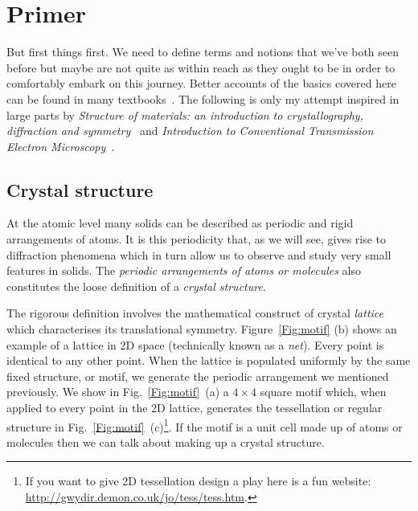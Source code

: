 \section{Primer}
But first things first. We need to define terms and notions that we've both seen before but maybe are not quite as within reach as they ought to be in order to comfortably embark on this journey. Better accounts of the basics covered here can be found in many textbooks~\cite{electronMicroscopy,Williams96,reimerSEM}. The following is only my attempt inspired in large parts by \textit{Structure of materials: an introduction to crystallography, diffraction and symmetry}~\cite{SoM} and \textit{Introduction to Conventional Transmission Electron Microscopy}~\cite{MarcTEM03}.

\subsection{Crystal structure}
\label{Sec:crystalStruct}
At the atomic level many solids can be described as periodic and rigid arrangements of atoms. It is this periodicity that, as we will see, gives rise to diffraction phenomena which in turn allow us to observe and study very small features in solids. The \textit{periodic arrangements of atoms or molecules} also constitutes the loose definition of a \textit{crystal structure}.

The rigorous definition involves the mathematical construct of crystal \textit{lattice} which characterises its translational symmetry. Figure~\ref{Fig:motif} (b) shows an example of a lattice in 2D space (technically known as a \textit{net}). Every point is identical to any other point. When the lattice is populated uniformly by the same fixed structure, or motif, we generate the periodic arrangement we mentioned previously. We show in Fig.~\ref{Fig:motif}~(a) a $4\times4$ square motif which, when applied to every point in the 2D lattice, generates the tessellation or regular structure in Fig.~\ref{Fig:motif}~(c)\footnote{If you want to give 2D tessellation design a play here is a fun website: \href{http://gwydir.demon.co.uk/jo/tess/tess.htm}{http://gwydir.demon.co.uk/jo/tess/tess.htm}.}. If the motif is a unit cell made up of atoms or molecules then we can talk about making up a crystal structure. 


